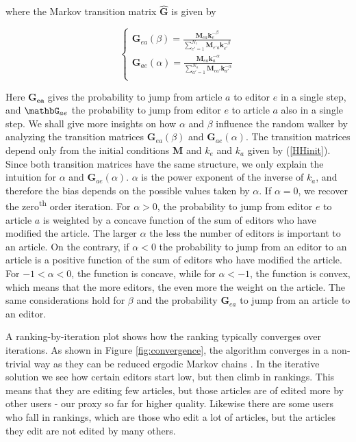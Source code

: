 where the Markov transition matrix $\mathbf{\hat{G}}$ is given by 

\begin{equation}
\begin{cases}
\mathbf{G}_{ea}(\beta) = \frac{\mathbf{M}_{ea} \mathbf{k}_{e}^{-\beta}}{\sum_{e' = 1}^{N_e} \mathbf{M}_{e'a} \mathbf{k}_{e'}^{-\beta}}\\
\mathbf{G}_{ae}(\alpha) = \frac{\mathbf{M}_{ea} \mathbf{k}_{a}^{-\alpha}}{\sum_{a' = 1}^{N_a} \mathbf{M}_{ea'} \mathbf{k}_{a'}^{-\alpha}}\\
 \end{cases}
\end{equation}

Here $\mathbf{G_{ea}}$ gives the probability to jump from article $a$ to editor $e$ in a single step, and $\mathbG_{ae}$ the probability to jump from editor $e$ to article $a$ also in a single step. We shall give more insights on how $\alpha$ and $\beta$ influence the random walker by analyzing the transition matrices $\mathbf{G}_{ea}(\beta)$ and $\mathbf{G}_{ae}(\alpha)$. The transition matrices depend only from the initial conditions $\mathbf{M}$ and $k_e$ and $k_a$ given by (\ref{HHinit}). Since both transition matrices have the same structure, we only explain the intuition for  $\alpha$ and $\mathbf{G}_{ae}(\alpha)$. $\alpha$ is the power exponent of the inverse of $k_a$, and therefore the bias depends on the possible values taken by $\alpha$. If $\alpha = 0$, we recover the zero\textsuperscript{th} order iteration. For $\alpha > 0$, the probability to jump from editor $e$ to article $a$ is weighted by a concave function of the sum of editors who have modified the article. The larger $\alpha$ the less the number of editors is important to an article. On the contrary, if $\alpha < 0$ the probability to jump from an editor to an article is a positive function of the sum of editors who have modified the article. For $-1 < \alpha < 0$, the function is concave, while for $\alpha < -1$, the function is convex, which means that the more editors, the even more the weight on the article. The same considerations hold for $\beta$ and the probability $\mathbf{G}_{ea}$ to jump from an article to an editor.

A ranking-by-iteration plot shows how the ranking typically converges over iterations. As shown in Figure \ref{fig:convergence}, the algorithm converges in a non-trivial way as they can be reduced ergodic Markov chains \cite{caldarelli2012network}. In the iterative solution we see how certain editors start low, but then climb in rankings. This means that they are editing few articles, but those articles are of edited more by other users - our proxy so far for higher quality. Likewise there are some users who fall in rankings, which are those who edit a lot of articles, but the articles they edit are not edited by many others.

